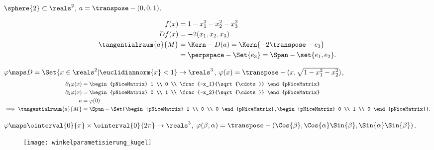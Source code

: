 \begin{beispiel*}
  \( \sphere{2}\subset \reals^2 \), \( a=\transpose-{(0,0,1)} \).
  \begin{eigenschaftenenumerate}
    \item
    \begin{align*}
      f(x)&=1-x_1^2-x_2^2-x_3^2\\
      Df(x)&=-2(x_1,x_2,x_3)\\
      \tangentialraum{a}{M}&=\Kern-{D(a)}=\Kern{-2\transpose-{e_3}}\\
      &=\perpspace-{\Set{e_3}}=\Span-{\set{e_1,e_2}}.
    \end{align*}
    \item \( \varphi\maps D=\Set{x\in \reals^2|\euclidiannorm{x}<1} \to \reals^3\), \( \varphi(x)=\transpose-{(x,\sqrt{1-x_1^2-x_2^2})} \),
    \begin{align*}
      \partial_1 \varphi(x)&=\begin{pNiceMatrix} 1 \\ 0 \\ \frac{-x_1}{\sqrt{\cdots}} \end{pNiceMatrix}\\
      \partial_2 \varphi(x)&=\begin{pNiceMatrix} 0 \\ 1 \\ \frac{-x_2}{\sqrt{\cdots}} \end{pNiceMatrix}\\
      a&= \varphi(0)\\
      \implies \tangentialraum{a}{M}&=\Span-{\Set{\begin{pNiceMatrix} 1 \\ 0 \\ 0 \end{pNiceMatrix},\begin{pNiceMatrix} 0 \\ 1 \\ 0 \end{pNiceMatrix}}}.
    \end{align*}
    \item \( \varphi\maps \ointerval{0}{\pi}\times\ointerval{0}{2\pi} \to \reals^3\), \( \varphi(\beta,\alpha)=\transpose-{(\Cos{\beta},\Cos{\alpha}\Sin{\beta},\Sin{\alpha}\Sin{\beta})} \). 
    \begin{figure}[H]
      \centering
      \texttt{[image: winkelparametisierung\_kugel]}
      \label{fig:winkelparametisierung_kugel}
    \end{figure}

\end{eigenschaftenenumerate}
\end{beispiel*}
